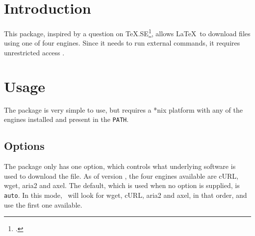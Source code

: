 \documentclass{skdoc}
\begin{document}

    \author{Simon Sigurdhsson}

    \maketitle
    \begin{abstract}
        The \thepackage\ package allows \LaTeX\ to download files using
        cURL, wget, aria2 or axel.
    \end{abstract}

    \section{Introduction}
    This package, inspired by a question on \TeX.SE\footcite{Klinger12},
    allows \LaTeX\ to download files using one of four engines.
    Since it needs
    to run external commands, it requires unrestricted 
    access . 

    \section{Usage}
    The package is very simple to use, but requires a *nix platform with
    any of the engines installed and present in the \texttt{PATH}.

    \subsection{Options}
    The package only has one option, which controls what underlying
    software is used to download the file. As of version \theversion,
    the four engines available are cURL, wget, aria2 and axel.
    The default, which is
    used when no option is supplied, is \texttt{auto}. In this mode,
    \thepkg\ will look for wget, cURL, aria2 and axel, in that order,
    and use the first one available.
\end{document}
